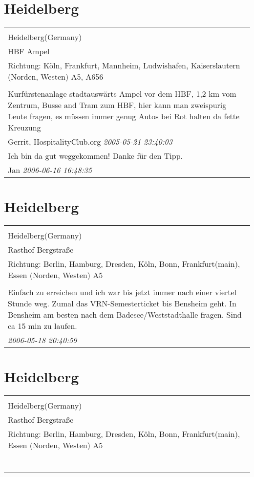 \documentclass[a4paper,12pt]{article}
\begin{document}
\section{Heidelberg}
\begin{tabular}{|p{13cm}|}
\hline\\
Heidelberg(Germany)\\
HBF Ampel\\
Richtung: Köln, Frankfurt, Mannheim, Ludwishafen, Kaiserslautern (Norden, Westen) A5, A656 \\
\hline\\
Kurfürstenanlage stadtauswärts Ampel vor dem HBF, 1,2 km vom Zentrum, Busse and Tram zum HBF, hier kann man zweispurig Leute fragen, es müssen immer genug Autos bei Rot halten da fette Kreuzung \\
Gerrit, HospitalityClub.org \textit{ 2005-05-21 23:40:03 }\\\hline Ich bin da gut weggekommen! Danke für den Tipp. \\
Jan \textit{ 2006-06-16 16:48:35 }\\\hline
\end{tabular}


\section{Heidelberg}
\begin{tabular}{|p{13cm}|}
\hline\\
Heidelberg(Germany)\\
Rasthof Bergstraße\\
Richtung: Berlin, Hamburg, Dresden, Köln, Bonn, Frankfurt(main), Essen (Norden, Westen) A5 \\
\hline\\
Einfach zu erreichen und ich war bis jetzt immer nach einer viertel Stunde weg. Zumal das VRN-Semesterticket bis Bensheim geht. In Bensheim am besten nach dem Badesee/Weststadthalle fragen. Sind ca 15 min zu laufen. \\
\textit{ 2006-05-18 20:40:59 }\\\hline
\end{tabular}


\section{Heidelberg}
\begin{tabular}{|p{13cm}|}
\hline\\
Heidelberg(Germany)\\
Rasthof Bergstraße\\
Richtung: Berlin, Hamburg, Dresden, Köln, Bonn, Frankfurt(main), Essen (Norden, Westen) A5 \\
\hline\\
\\\
\end{tabular}
\end{document}
